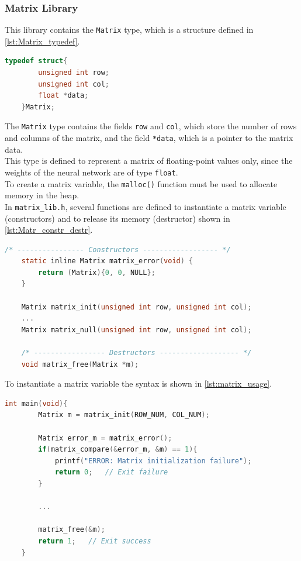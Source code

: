 \newpage
\subsubsection{Matrix Library}
\label{sssec:matrix_library}

This library contains the \texttt{Matrix} type, which is a structure defined in \autoref{lst:Matrix_typedef}.

\vspace{1em}
\begin{lstlisting}[language=C, caption={Matrix type}, label={lst:Matrix_typedef}, morekeywords={Matrix}]
    typedef struct{
        unsigned int row;
        unsigned int col;
        float *data;
    }Matrix;
\end{lstlisting}

\noindent
The \texttt{Matrix} type contains the fields \texttt{row} and \texttt{col}, which store the number of rows and columns of the matrix, and the field \texttt{*data}, which is a pointer to the matrix data. \\
This type is defined to represent a matrix of floating-point values only, since the weights of the neural network are of type \texttt{float}. \\
To create a matrix variable, the \texttt{malloc()} function must be used to allocate memory in the heap. \\
In \texttt{matrix\_lib.h}, several functions are defined to instantiate a matrix variable (constructors) and to release its memory (destructor) shown in \autoref{lst:Matr_constr_destr}.

\vspace{1em}
\begin{lstlisting}[language=C, caption={Constructors and Destructor}, label={lst:Matr_constr_destr}, morekeywords={Matrix}]
    /* ---------------- Constructors ------------------ */
    static inline Matrix matrix_error(void) {
        return (Matrix){0, 0, NULL};
    }
    
    Matrix matrix_init(unsigned int row, unsigned int col);
    ...             
    Matrix matrix_null(unsigned int row, unsigned int col);

    /* ----------------- Destructors ------------------- */
    void matrix_free(Matrix *m);
\end{lstlisting}

\newpage
\noindent
To instantiate a matrix variable the syntax is shown in \autoref{lst:matrix_usage}.

\vspace{1em}
\begin{lstlisting}[language=C, caption={Matrix usage example}, label={lst:matrix_usage}, morekeywords={Matrix}]
    int main(void){
        Matrix m = matrix_init(ROW_NUM, COL_NUM);

        Matrix error_m = matrix_error();
        if(matrix_compare(&error_m, &m) == 1){
            printf("ERROR: Matrix initialization failure");
            return 0;   // Exit failure
        }
        
        ...
        
        matrix_free(&m);
        return 1;   // Exit success
    }
\end{lstlisting}

